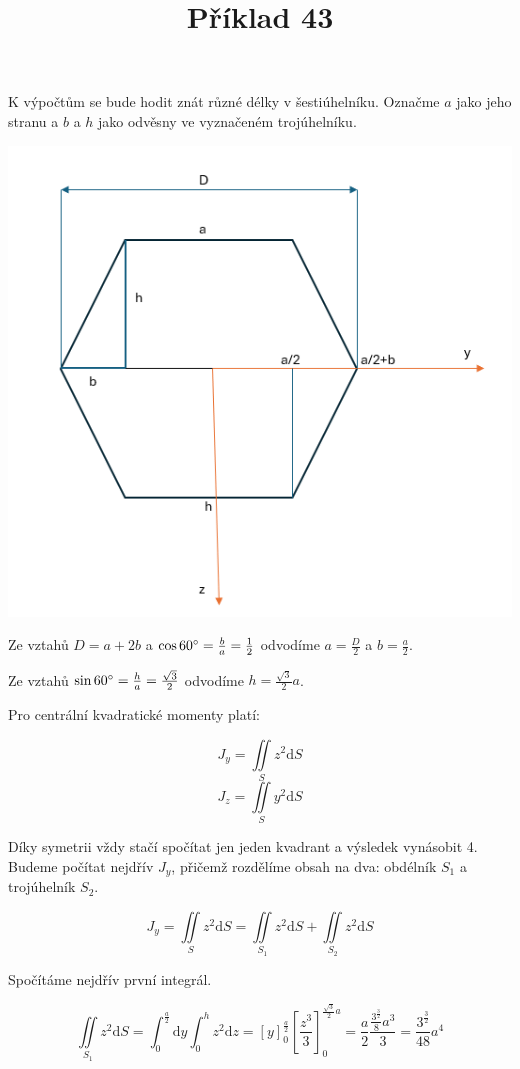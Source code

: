 \documentclass{article}
\begin{document}
\title{Příklad 43}
\maketitle

K výpočtům se bude hodit znát různé délky v šestiúhelníku. Označme $a$ jako jeho stranu a $b$ a $h$ jako odvěsny ve vyznačeném trojúhelníku. 

\includegraphics{idk.png}

Ze vztahů $D=a+2b$ a $\cos{60\degree}=\frac{b}{a}=\frac{1}{2}$ odvodíme $a=\frac{D}{2}$ a $b=\frac{a}{2}$.

Ze vztahů $\sin{60\degree}=\frac{h}{a}=\frac{\sqrt{3}}{2}$ odvodíme $h=\frac{\sqrt{3}}{2}a$.

Pro centrální kvadratické momenty platí:

\[ J_y=\iint\limits_{S} z^2\mathrm{d}S \] 
\[ J_z=\iint\limits_{S} y^2\mathrm{d}S \] 

Díky symetrii vždy stačí spočítat jen jeden kvadrant a výsledek vynásobit 4. Budeme počítat nejdřív $J_y$, přičemž rozdělíme obsah na dva: obdélník $S_1$ a trojúhelník $S_2$.

\[ J_y=\iint\limits_{S} z^2\mathrm{d}S = \iint\limits_{S_1} z^2\mathrm{d}S + \iint\limits_{S_2} z^2\mathrm{d}S\] 

Spočítáme nejdřív první integrál.

\[ \iint\limits_{S_1} z^2\mathrm{d}S = \int_{0}^{\frac{a}{2}}\mathrm{d}y \int_{0}^{h} z^2 \mathrm{d}z = \left[y\right]_0^{\frac{a}{2}} \left[\frac{z^3}{3}\right]_0^{\frac{\sqrt{3}}{2}a} 
= \frac{a}{2} \frac{\frac{3^{\frac{3}{2}}}{8}a^3}{3} = \frac{3^{\frac{3}{2}}}{48}a^4\] 
\end{document}
